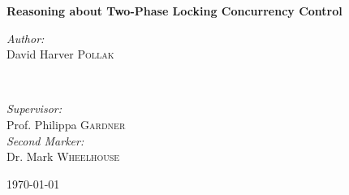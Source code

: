 \begin{titlepage}
\vspace*{\fill}
    \begin{center}
        \Huge
        \textbf{Reasoning about Two-Phase Locking Concurrency Control}
        
        \vspace{1.5cm}
        
        \begin{minipage}{0.45\textwidth}
			\begin{flushleft} \Large
				\emph{Author:}\\
				David Harver \textsc{Pollak}
			\end{flushleft}
		\end{minipage}
			~
		\begin{minipage}{0.5\textwidth}
			\begin{flushright} \Large
			\emph{Supervisor:} \\
			Prof. Philippa \textsc{Gardner} \\
			\vspace{0.5cm}
			\emph{Second Marker:} \\
			Dr. Mark \textsc{Wheelhouse}
			\end{flushright}
		\end{minipage}
		
		 \vspace{1.5cm}
		
		{\Large \today}
    \end{center}
\vspace*{\fill}
\end{titlepage}